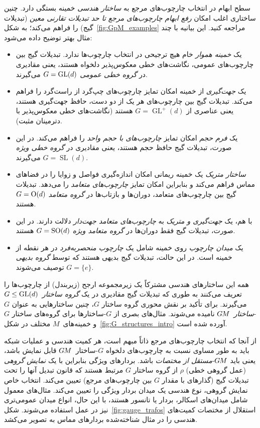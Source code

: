 سطح ابهام در انتخاب چارچوب‌های مرجع به \emph{ساختار هندسی} خمینه بستگی دارد.
چنین ساختاری اغلب امکان
\emph{رفع ابهام چارچوب‌های مرجع تا حد تبدیلات تقارنی معین} (تبدیلات گیج) را فراهم می‌کند؛ به شکل~\ref{fig:GpM_examples} مراجعه کنید.
این بیانیه با چند مثال بهتر توضیح داده می‌شود:
\begin{itemize}[leftmargin=1.2cm]
	\item[{\rule[2.2pt]{2pt}{2pt}}]
	یک \emph{خمینه هموار} خام هیچ ترجیحی در انتخاب چارچوب‌ها ندارد.
	تبدیلات گیج بین چارچوب‌های عمومی، نگاشت‌های خطی معکوس‌پذیر دلخواه هستند، یعنی مقادیری در \emph{گروه خطی عمومی} ${G=\operatorname{GL}(d)}$ می‌گیرند.
	\item[{\rule[2.2pt]{2pt}{2pt}}]
	یک \emph{جهت‌گیری} از خمینه امکان تمایز چارچوب‌های چپ‌گرد از راست‌گرد را فراهم می‌کند.
	تبدیلات گیج بین چارچوب‌های هر یک از دو دست، حافظ جهت‌گیری هستند، یعنی عناصری از ${G=\operatorname{GL}^+(d)}$ هستند (نگاشت‌های خطی معکوس‌پذیر با دترمینان مثبت).
	\item[{\rule[2.2pt]{2pt}{2pt}}]
	یک \emph{فرم حجم} امکان تمایز \emph{چارچوب‌های با حجم واحد} را فراهم می‌کند.
	در این صورت، تبدیلات گیج حافظ حجم هستند، یعنی مقادیری در \emph{گروه خطی ویژه} $G=\operatorname{SL}(d)$ می‌گیرند.
	\item[{\rule[2.2pt]{2pt}{2pt}}]
	\emph{ساختار متریک} یک خمینه ریمانی امکان اندازه‌گیری فواصل و زوایا را در فضاهای مماس فراهم می‌کند و بنابراین امکان تمایز \emph{چارچوب‌های متعامد} را می‌دهد.
	تبدیلات گیج بین چارچوب‌های متعامد، دوران‌ها و بازتاب‌ها در \emph{گروه متعامد} $G=\operatorname{O}(d)$ هستند.
	\item[{\rule[2.2pt]{2pt}{2pt}}]
	با هم، یک \emph{جهت‌گیری و متریک} به \emph{چارچوب‌های متعامد جهت‌دار} دلالت دارند.
	در این صورت، تبدیلات گیج فقط دوران‌ها در \emph{گروه متعامد ویژه} $G=\operatorname{SO}(d)$ هستند.
	\item[{\rule[2.2pt]{2pt}{2pt}}]
	یک \emph{میدان چارچوب} روی خمینه شامل یک \emph{چارچوب منحصربه‌فرد} در هر نقطه از خمینه است.
	در این حالت، تبدیلات گیج بدیهی هستند که توسط \emph{گروه بدیهی} $G=\{e\}$ توصیف می‌شوند.
\end{itemize}
همه این ساختارهای هندسی مشترکاً یک زیرمجموعه ارجح (زیربندل) از چارچوب‌ها را تعریف می‌کنند به طوری که تبدیلات گیج مقادیری در یک \emph{گروه ساختار}~$G\leq\operatorname{GL}(d)$ می‌گیرند.
برای تأکید بر نقش محوری گروه ساختار $G$، چنین ساختارهایی به عنوان $G$-\emph{ساختار}~$G\mkern-1.4muM$ نامیده می‌شوند.
مثال‌های بصری از $G$-ساختارها برای گروه‌های ساختار $G$ و خمینه‌های~$M$ مختلف در شکل~\ref{fig:G_structures_intro} آورده شده است.


از آنجا که انتخاب چارچوب‌های مرجع ذاتاً مبهم است، هر کمیت هندسی و عملیات شبکه باید به طور مساوی نسبت به چارچوب‌های دلخواه $G$-ساختار~$G\mkern-1.4muM$ قابل نمایش باشد، یعنی باید $G\mkern-1.4muM$-\emph{مستقل از مختصات} باشد.
بردارهای ویژگی بنابراین با یک \emph{نمایش گروهی} (عمل گروهی خطی) $\rho$ از گروه ساختار $G$ مرتبط هستند که قانون تبدیل آنها را تحت تبدیلات گیج (گذار‌های با مقدار $G$ بین چارچوب‌های مرجع) تعیین می‌کند.
انتخاب خاص نمایش گروهی، نوع هندسی یک میدان بردار ویژگی را تعیین می‌کند.
مثال‌های معمول شامل میدان‌های اسکالر، بردار یا تانسور هستند، با این حال، انواع میدان عمومی‌تری نیز در عمل استفاده می‌شوند.
شکل~\ref{fig:gauge_trafos} استقلال از مختصات کمیت‌های هندسی را در مثال شناخته‌شده بردارهای مماس به تصویر می‌کشد.


